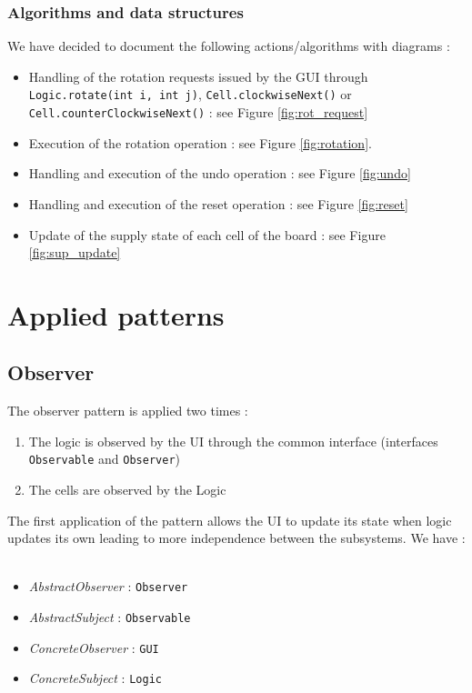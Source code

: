 \documentclass[a4paper,11pt]{article}
\begin{document}
\subsubsection{Algorithms and data structures}
We have decided to document the following actions/algorithms with diagrams :
\begin{itemize}
	\item Handling of the rotation requests issued by the GUI through \texttt{Logic.rotate(int i, int j)}, \texttt{Cell.clockwiseNext()} or \texttt{Cell.counterClockwiseNext()} : see Figure \ref{fig:rot_request}
	\item Execution of the rotation operation : see Figure \ref{fig:rotation}.
	\item Handling and execution of the undo operation  : see Figure \ref{fig:undo}
	\item Handling and execution of the reset operation : see Figure \ref{fig:reset}
	\item Update of the supply state of each cell of the board : see Figure \ref{fig:sup_update}
\end{itemize}
\section{Applied patterns}
\subsection{Observer}
The observer pattern is applied two times : 
\begin{enumerate}
	\item The logic is observed by the UI through the common interface (interfaces \texttt{Observable} and \texttt{Observer})
	\item The cells are observed by the Logic
\end{enumerate}
The first application of the pattern allows the UI to update its state when logic updates its own leading to more independence between the subsystems. We have : \\ \\
\begin{itemize}
	\item \textit{AbstractObserver} : \texttt{Observer}
	\item \textit{AbstractSubject} : \texttt{Observable}
	\item \textit{ConcreteObserver} : \texttt{GUI}
	\item \textit{ConcreteSubject} : \texttt{Logic}
\end{itemize}
\end{document}
